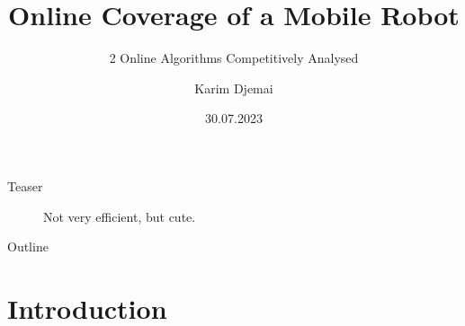 \documentclass{beamer}
\title{Online Coverage of a Mobile Robot}
\subtitle{2 Online Algorithms Competitively Analysed}
\author{Karim Djemai}
\institute{Universität Hamburg}
\date{30.07.2023}
\begin{document}

\begin{frame}
    \maketitle %
\end{frame}


\begin{frame}{Teaser}
    \begin{figure}
        \caption{Not very efficient, but cute.}
    \end{figure}
\end{frame}

\begin{frame}{Outline}
    \tableofcontents[hideallsubsections]
\end{frame}

\section{Introduction}
\end{document}
